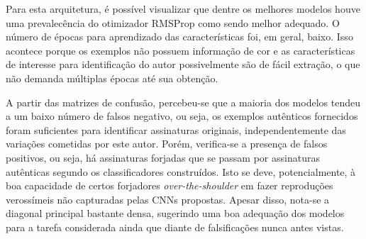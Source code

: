 
Para esta arquitetura, é possível visualizar que dentre os melhores modelos houve uma prevalecência do otimizador RMSProp como sendo melhor adequado. O número de épocas para aprendizado das características foi, em geral, baixo. Isso acontece porque os exemplos não possuem informação de cor e as características de interesse para identificação do autor possivelmente são de fácil extração, o que não demanda múltiplas épocas até sua obtenção.

A partir das matrizes de confusão, percebeu-se que a  maioria dos modelos tendeu a um baixo número de falsos negativo, ou seja, os exemplos autênticos fornecidos foram suficientes para identificar assinaturas originais, independentemente das variações cometidas por este autor. Porém, verifica-se a presença de falsos positivos, ou seja,  há assinaturas forjadas que se passam por assinaturas autênticas segundo os classificadores construídos. Isto se deve, potencialmente, à boa capacidade de certos forjadores \emph{over-the-shoulder} em fazer reproduções verossímeis não capturadas pelas CNNs propostas. Apesar disso, nota-se a diagonal principal bastante densa, sugerindo uma boa adequação dos modelos para a tarefa considerada ainda que diante de falsificações nunca antes vistas.
